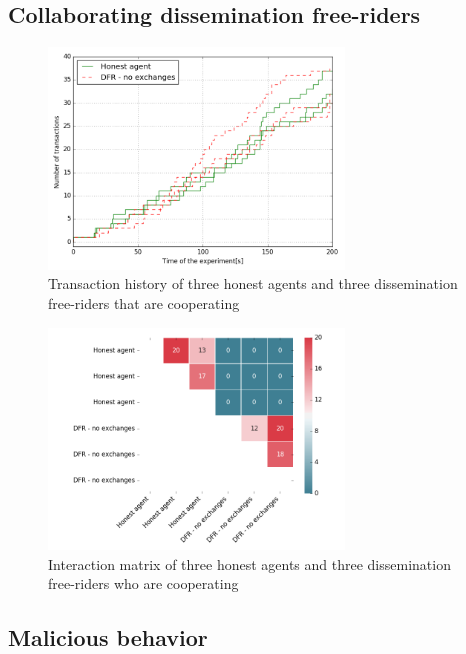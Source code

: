 \subsection{Collaborating dissemination free-riders}

\begin{figure}[h!]
    \centering
    \includegraphics[width=0.7\textwidth]{images/50percent}
    \caption{Transaction history of three honest agents and three dissemination free-riders
    that are cooperating}
    \label{fig:50percent}
\end{figure}

\begin{figure}[h!]
    \centering
    \includegraphics[width=0.7\textwidth]{images/50percent_interaction_matrix}
    \caption{Interaction matrix of three honest agents and three dissemination free-riders who are cooperating}
    \label{fig:50percent}
\end{figure}

\subsection{Malicious behavior}


